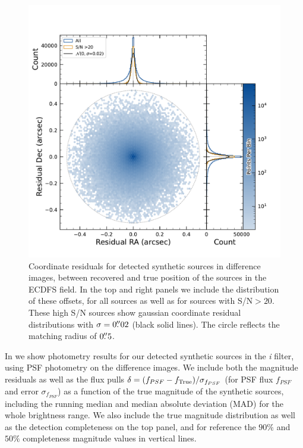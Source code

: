 \begin{figure}[htb!]
\centering
\includegraphics[trim={0 0 0 0},width=\linewidth]{figures/coordinate_offsets_hexbin.pdf}
\caption{Coordinate residuals for detected synthetic sources in difference images, between recovered and true position of the sources in the \gls{ECDFS} field. 
In the top and right panels we include the distribution of these offsets, for all sources as well as for sources with S/N$>20$. 
These high S/N sources show gaussian coordinate residual distributions with $\sigma=0\mbox{$.\!\!^{\prime\prime}$}02$ (black solid lines). 
The circle reflects the matching radius of $0\mbox{$.\!\!^{\prime\prime}$}5$.}
\label{fig:coordinate_offset_diffim_fakes}
\end{figure}
%
In  we show photometry results for our detected synthetic sources in the \textit{i} filter, using \gls{PSF} photometry on the difference images. 
We include both the magnitude residuals as well as the \gls{flux} pulls $\delta = (f_{PSF}-f_{\rm{True}})/\sigma_{f_{PSF}}$ (for PSF \gls{flux} $f_{PSF}$ and error $\sigma_{f_{PSF}}$) as a function of the true magnitude of the synthetic sources, including the running median and median absolute deviation (MAD) for the whole brightness range. 
We also include the true magnitude distribution as well as the detection completeness on the top panel, and for reference the $90\%$ and $50\%$ completeness magnitude values in vertical lines. 
